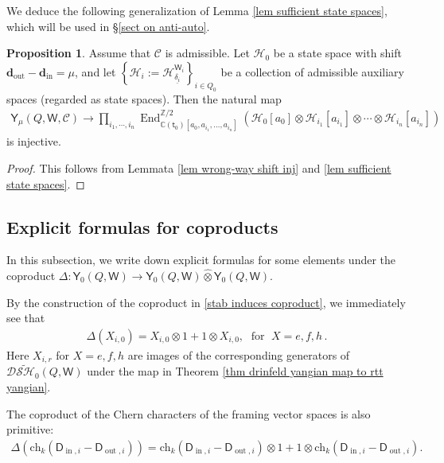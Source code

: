 \documentclass[10pt]{amsart}
\theoremstyle{definition}
\newtheorem{Proposition}[Theorem]{Proposition}
\numberwithin{equation}{section}
\newcommand{\bC}{\mathbb{C}}
\newcommand{\bZ}{\mathbb{Z}}
\newcommand{\bd}{\mathbf{d}}
\newcommand{\cH}{\mathcal{H}}
\newcommand{\sW}{\mathsf{W}}
\newcommand{\End}{\operatorname{End}}
\newcommand{\In}{\operatorname{in}}
\newcommand{\Out}{\operatorname{out}}
\begin{document}
We deduce the following generalization of Lemma \ref{lem sufficient state spaces}, 
which will be used in \S \ref{sect on anti-auto}.
\begin{Proposition}\label{prop sufficient state spaces}
Assume that $\mathcal C$ is admissible. Let $\cH_0$ be a state space with shift $\bd_{\Out}-\bd_{\In}=\mu$, and let $\left\{\cH_i:=\cH^{\sW_i}_{\underline{\delta_i}}\right\}_{i\in Q_0}$ be a collection of admissible auxiliary spaces (regarded as state spaces). Then the natural map
\begin{align*}
    \mathsf Y_\mu(Q,\sW,\mathcal C)\longrightarrow \prod_{i_1,\cdots,i_n}\End^{\bZ/2}_{\bC(\mathsf t_0)[a_{0},a_{i_1},\ldots,a_{i_n}]}\left(\cH_0[a_0]\otimes\cH_{i_1}[a_{i_1}]\otimes\cdots\otimes \cH_{i_n}[a_{i_n}]\right)
\end{align*}
is injective.
\end{Proposition}
\begin{proof}
This follows from Lemmata \ref{lem wrong-way shift inj} and \ref{lem sufficient state spaces}.
\end{proof}



\subsection{Explicit formulas for coproducts}\label{expl formula of coprod}
In this subsection, we write down explicit formulas for some elements under the coproduct $\Delta\colon \mathsf Y_0(Q,\sW)\to \mathsf Y_0(Q,\sW)\widehat{\otimes}\mathsf Y_0(Q,\sW)$.

By the construction of the coproduct in \eqref{stab induces coproduct}, we immediately see that
\begin{align}\label{coproduct e f h lowest}
    \Delta(X_{i,0})=X_{i,0}\otimes 1+1\otimes X_{i,0},\;\text{ for }\; X=e,f,h\,.
\end{align}
Here $X_{i,r}$ for $X=e,f,h$ are images of the corresponding generators of $\mathcal{D}\widetilde{\mathcal{SH}}_0(Q,\sW)$ under the map in Theorem \ref{thm drinfeld yangian map to rtt yangian}.

The coproduct of the Chern characters of the framing vector spaces is also primitive:
\begin{align}
    \Delta(\mathrm{ch}_k(\mathsf D_{\In,i}-\mathsf D_{\Out,i}))=\mathrm{ch}_k(\mathsf D_{\In,i}-\mathsf D_{\Out,i})\otimes 1+1\otimes\mathrm{ch}_k(\mathsf D_{\In,i}-\mathsf D_{\Out,i}).
\end{align}
\end{document}
